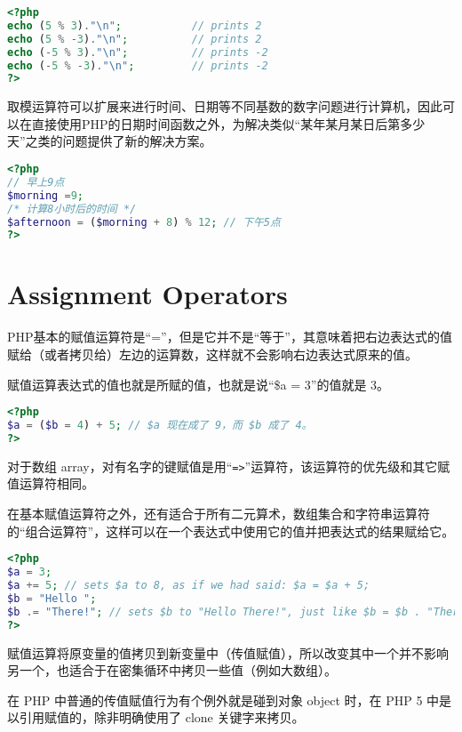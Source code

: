 \begin{lstlisting}[language=PHP]
<?php
echo (5 % 3)."\n";           // prints 2
echo (5 % -3)."\n";          // prints 2
echo (-5 % 3)."\n";          // prints -2
echo (-5 % -3)."\n";         // prints -2
?>
\end{lstlisting}

取模运算符可以扩展来进行时间、日期等不同基数的数字问题进行计算机，因此可以在直接使用PHP的日期时间函数之外，为解决类似“某年某月某日后第多少天”之类的问题提供了新的解决方案。

\begin{lstlisting}[language=PHP]
<?php
// 早上9点
$morning =9; 
/* 计算8小时后的时间 */
$afternoon = ($morning + 8) % 12; // 下午5点
?>
\end{lstlisting}

\section{Assignment Operators}

PHP基本的赋值运算符是“=”，但是它并不是“等于”，其意味着把右边表达式的值赋给（或者拷贝给）左边的运算数，这样就不会影响右边表达式原来的值。

赋值运算表达式的值也就是所赋的值，也就是说“\$a = 3”的值就是 3。



\begin{lstlisting}[language=PHP]
<?php
$a = ($b = 4) + 5; // $a 现在成了 9，而 $b 成了 4。
?>
\end{lstlisting}

对于数组 array，对有名字的键赋值是用“\texttt{=>}”运算符，该运算符的优先级和其它赋值运算符相同。

在基本赋值运算符之外，还有适合于所有二元算术，数组集合和字符串运算符的“组合运算符”，这样可以在一个表达式中使用它的值并把表达式的结果赋给它。

\begin{lstlisting}[language=PHP]
<?php
$a = 3;
$a += 5; // sets $a to 8, as if we had said: $a = $a + 5;
$b = "Hello ";
$b .= "There!"; // sets $b to "Hello There!", just like $b = $b . "There!";
?>
\end{lstlisting}

赋值运算将原变量的值拷贝到新变量中（传值赋值），所以改变其中一个并不影响另一个，也适合于在密集循环中拷贝一些值（例如大数组）。

在 PHP 中普通的传值赋值行为有个例外就是碰到对象 object 时，在 PHP 5 中是以引用赋值的，除非明确使用了 clone 关键字来拷贝。

